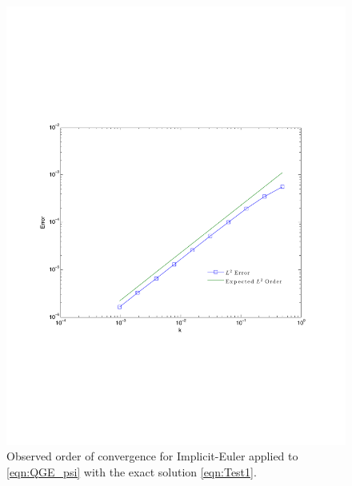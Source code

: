 \begin{figure}
  \begin{center}
    \includegraphics[scale=0.6]{sin2sin2sinTimeConvergence.pdf}
    \caption{Observed order of convergence for Implicit-Euler applied to
      \eqref{eqn:QGE_psi} with the exact solution \eqref{eqn:Test1}.}
  \label{fig:Test1Time}
  \end{center}
\end{figure}

